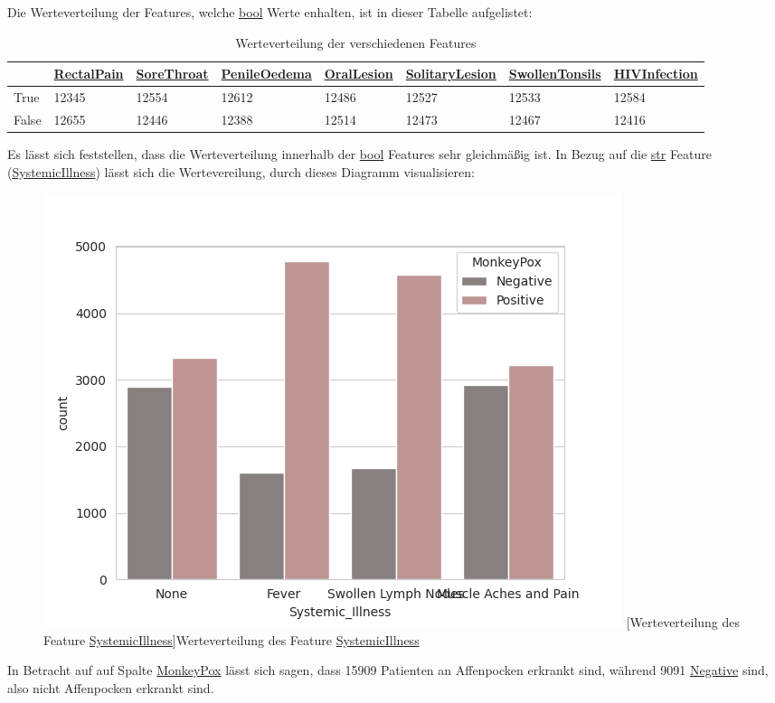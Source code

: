 \documentclass[13pt,a4paper, listof=entryprefix, bibliography=totocnumbered,toc=listofnumbered,lof=listofnumbered]{scrartcl}
\begin{document}
	Die Werteverteilung der Features, welche \url{bool} Werte enhalten, ist in dieser Tabelle aufgelistet: 
	
	\begin{table}[H]
		\centering
		\begin{tabular}{|l|l|l|l|l|l|l|l|}
			\hline  & \url{RectalPain}&  \url{SoreThroat}	& \url{PenileOedema} & \url{OralLesion} & \url{SolitaryLesion} &\url{SwollenTonsils} & \url{HIVInfection} \\
			\hline True & 12345 & 12554 & 12612 & 12486 & 12527 & 12533 & 12584   \\
			\hline False & 12655 & 12446 & 12388& 12514 & 12473 & 12467 & 12416 \\
			\hline
		\end{tabular}
		\caption{Werteverteilung der verschiedenen Features} %
		\label{tab:werteverteilung_features}
	\end{table}

	Es lässt sich feststellen, dass die Werteverteilung innerhalb der \url{bool} Features sehr gleichmäßig ist. 
	In Bezug auf die \url{str} Feature (\url{SystemicIllness}) lässt sich die Wertevereilung, durch dieses Diagramm
	visualisieren: 

	\begin{figure}[H]
		\centering
		\includegraphics[width=0.8\linewidth]{Bilder/systemic_illness_plot.png}
		[Werteverteilung des Feature \url{SystemicIllness}]{Werteverteilung des Feature \url{SystemicIllness}}
		\label{fig:systemic_illness_plot}
	\end{figure}

	In Betracht auf auf Spalte \url{MonkeyPox} lässt sich sagen, dass 15909 Patienten an Affenpocken erkrankt sind, während 9091 \url{Negative} sind,
	also nicht Affenpocken erkrankt sind. 
\end{document}
